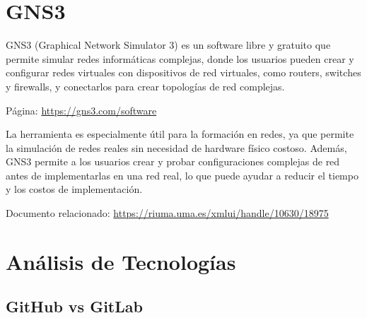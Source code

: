     \section{GNS3}
    
        GNS3 (Graphical Network Simulator 3) es un software libre y gratuito que permite simular redes informáticas complejas, donde los usuarios pueden crear y configurar redes virtuales con dispositivos de red virtuales, como routers, switches y firewalls, y conectarlos para crear topologías de red complejas.
        
        Página: \url{https://gns3.com/software}
        
        La herramienta es especialmente útil para la formación en redes, ya que permite la simulación de redes reales sin necesidad de hardware físico costoso. Además, GNS3 permite a los usuarios crear y probar configuraciones complejas de red antes de implementarlas en una red real, lo que puede ayudar a reducir el tiempo y los costos de implementación.
        
        Documento relacionado: \url{https://riuma.uma.es/xmlui/handle/10630/18975}
        
        \cleardoublepage


    \section{Análisis de Tecnologías}

        \subsection{GitHub vs GitLab}

